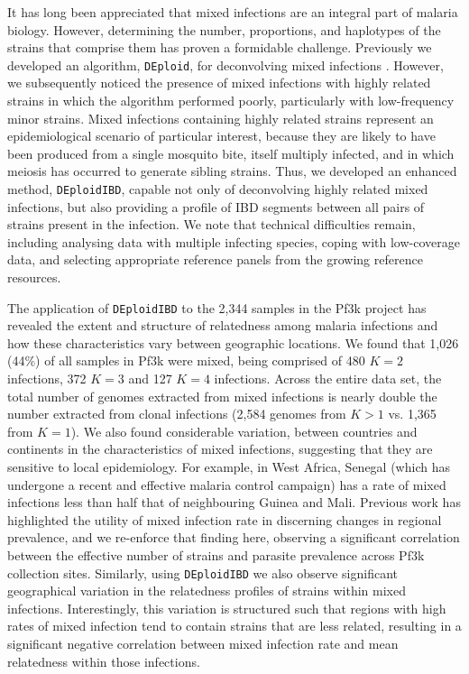 \documentclass[9pt,lineno]{elife}
\begin{document}
It has long been appreciated that mixed infections are an integral part of malaria biology.  However, determining the number, proportions, and haplotypes of the strains that comprise them has proven a formidable challenge.  Previously we developed an algorithm, \texttt{DEploid}, for deconvolving mixed infections \citep{Zhu2017}.  However, we subsequently noticed the presence of mixed infections with highly related strains in which the algorithm performed poorly, particularly with low-frequency minor strains.  Mixed infections containing highly related strains represent an epidemiological scenario of particular interest, because  they are likely to have been produced from a single mosquito bite, itself multiply infected, and in which meiosis has occurred to generate sibling strains. Thus, we developed an enhanced method, \texttt{DEploidIBD}, capable not only of deconvolving highly related mixed infections, but also providing a profile of IBD segments between all pairs of strains present in the infection.  We note that technical difficulties remain, including analysing data with multiple infecting species, coping with low-coverage data, and selecting appropriate reference panels from the growing reference resources.

The application of \texttt{DEploidIBD} to the 2,344 samples in the Pf3k project has revealed the extent and structure of relatedness among malaria infections and how these characteristics vary between geographic locations. We found that 1,026 (44\%) of all samples in Pf3k were mixed, being comprised of 480 $K=2$ infections, 372 $K=3$ and 127 $K=4$ infections. Across the entire data set, the total number of genomes extracted from mixed infections is nearly double the number extracted from clonal infections (2,584 genomes from $K>1$ vs. 1,365 from $K=1$).  We also found considerable variation, between countries and continents in the characteristics of mixed infections, suggesting that they are sensitive to local epidemiology.  For example, in West Africa, Senegal (which has undergone a recent and effective malaria control campaign) has a rate of mixed infections less than half that of neighbouring Guinea and Mali.  Previous work has highlighted the utility of mixed infection rate in discerning changes in regional prevalence, and we re-enforce that finding here, observing a significant correlation between the effective number of strains and parasite prevalence across Pf3k collection sites. Similarly, using \texttt{DEploidIBD} we also observe significant geographical variation in the relatedness profiles of strains within mixed infections.  Interestingly, this variation is structured such that regions with high rates of mixed infection tend to contain strains that are less related, resulting in a significant negative correlation between mixed infection rate and mean relatedness within those infections.
\end{document}
